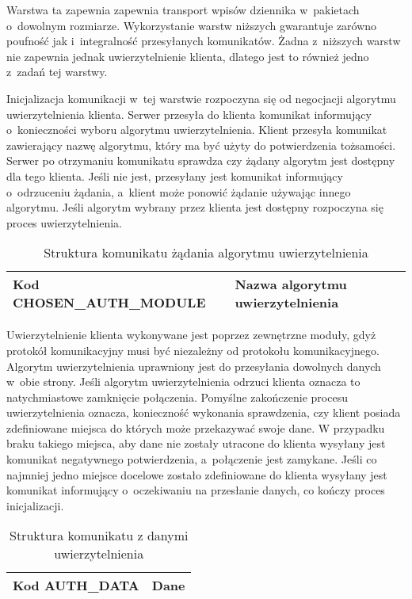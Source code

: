 Warstwa ta zapewnia zapewnia transport wpisów dziennika w~pakietach
o~dowolnym rozmiarze. Wykorzystanie warstw niższych gwarantuje zarówno
poufność jak i~integralność przesyłanych komunikatów. Żadna z~niższych
warstw nie zapewnia jednak uwierzytelnienie klienta, dlatego jest to
również jedno z~zadań tej warstwy.

Inicjalizacja komunikacji w~tej warstwie rozpoczyna się od negocjacji
algorytmu uwierzytelnienia klienta. Serwer przesyła do klienta
komunikat informujący o~konieczności wyboru algorytmu
uwierzytelnienia. Klient przesyła komunikat zawierający nazwę
algorytmu, który ma być użyty do potwierdzenia tożsamości. Serwer po
otrzymaniu komunikatu sprawdza czy żądany algorytm jest dostępny dla
tego klienta. Jeśli nie jest, przesyłany jest komunikat informujący
o~odrzuceniu żądania, a~klient może ponowić żądanie używając innego
algorytmu. Jeśli algorytm wybrany przez klienta jest dostępny
rozpoczyna się proces uwierzytelnienia.

\begin{table}[H]
\centering
\caption{Struktura komunikatu żądania algorytmu uwierzytelnienia }
\begin{tabular}{|p{4cm}|p{6cm}|}
\hline
\raggedright{Kod CHOSEN\_AUTH\_MODULE} & Nazwa algorytmu uwierzytelnienia\\
\hline
\end{tabular}
\end{table}

Uwierzytelnienie klienta wykonywane jest poprzez zewnętrzne moduły,
gdyż protokół komunikacyjny musi być niezależny od protokołu
komunikacyjnego. Algorytm uwierzytelnienia uprawniony jest do
przesyłania dowolnych danych w~obie strony. Jeśli algorytm
uwierzytelnienia odrzuci klienta oznacza to natychmiastowe zamknięcie
połączenia. Pomyślne zakończenie procesu uwierzytelnienia oznacza,
konieczność wykonania sprawdzenia, czy klient posiada zdefiniowane
miejsca do których może przekazywać swoje dane. W przypadku braku
takiego miejsca, aby dane nie zostały utracone do klienta wysyłany
jest komunikat negatywnego potwierdzenia, a~połączenie jest
zamykane. Jeśli co najmniej jedno miejsce docelowe zostało zdefiniowane
do klienta wysyłany jest komunikat informujący o~oczekiwaniu na
przesłanie danych, co kończy proces inicjalizacji.

\begin{table}[H]
\centering
\caption{Struktura komunikatu z danymi uwierzytelnienia }
\begin{tabular}{|p{3cm}|p{6cm}|}
\hline
Kod AUTH\_DATA & Dane \\
\hline
\end{tabular}
\end{table}

